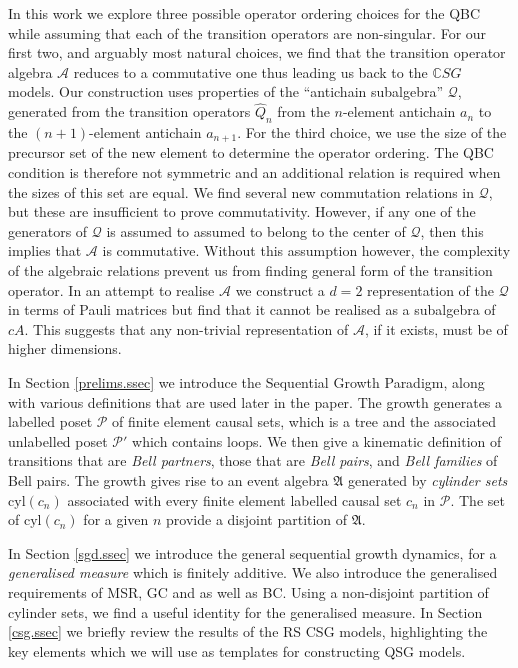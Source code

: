 \documentclass[11pt]{article}
\newcommand{\bC}{\mathbb C}
\newcommand{\cyl}[1]{{\mathrm{cyl}({#1})}}
\newcommand{\cP}{\mathcal P}
\newcommand{\hQ}{\hat Q}
\newcommand{\fA}{\mathfrak A}
\newcommand{\cA}{\mathcal A}
\newcommand{\CSG}{\bC S G}
\newcommand{\achain}{a}
\newcommand{\cQ}{\mathcal Q}
\begin{document}
In this work we explore three possible operator ordering
choices for the QBC while assuming that each of the transition operators 
are non-singular. For our first two, and arguably most natural  choices,
we find that the transition operator algebra $\cA$ reduces to a
commutative one thus leading us back to the $\CSG$ models. Our
construction uses  properties of the ``antichain subalgebra'' $\cQ$, generated from
the transition operators $\hQ_n$ from the $n$-element
antichain $\achain_n$ to the  $(n+1)$-element
antichain $\achain_{n+1}$.  For the
third choice, we use the size of the precursor set of the
new element to determine the operator ordering.  The QBC condition
is therefore not symmetric and an additional relation is required  when the sizes of this set are
equal.  We find several new commutation
relations in $\cQ$, but these are insufficient to prove commutativity.
However, if  any one of the generators of $\cQ$ is assumed to assumed
to belong to the center of $\cQ$, then this implies that  $\cA$ is commutative. Without this
assumption however, the complexity of the algebraic
relations prevent us from finding general form of  the transition
operator.  In an attempt to realise $\cA$ we  construct
a $d=2$ representation of the $\cQ$   in terms of  Pauli
matrices but find that it cannot be realised as a subalgebra of $cA$.
This suggests that any non-trivial representation of $\cA$, if it
exists, must be of higher dimensions.  



In Section \ref{prelims.ssec} we introduce the Sequential Growth
Paradigm, along with various definitions that are used later in the
paper. The growth generates a labelled poset $\cP$ of finite element causal
sets, which is a tree and the associated unlabelled poset $\cP'$ which
contains loops.  We then give a kinematic  definition of transitions
that are {\sl Bell partners}, those that are {\sl Bell pairs}, and
{\sl Bell families}  of Bell pairs. The growth gives rise to an  event algebra $\fA$ generated
by  {\sl cylinder
sets} $\cyl{c_n}$ associated with every finite element  labelled causal set $c_n$
in $\cP$.  The set of $\cyl{c_n}$ for a given $n$ provide a disjoint partition of
$\fA$. 

In Section
\ref{sgd.ssec} we introduce the general sequential growth dynamics,
for a {\sl generalised measure} which is finitely additive. We also introduce the 
generalised requirements  of MSR, GC and as well as  BC. Using a
non-disjoint partition of cylinder sets, we find a useful identity for
the generalised measure.  In Section \ref{csg.ssec} we briefly review
the results of the RS CSG models,  highlighting  the key elements which we
will use as templates for constructing QSG models.
\end{document}
